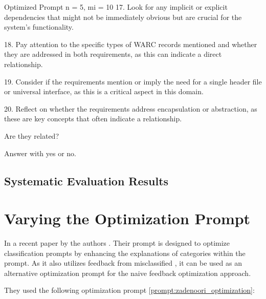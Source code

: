 \begin{prompt}{Optimized Prompt n = 5, mi = 10}
17. Look for any implicit or explicit dependencies that might not be immediately obvious but are crucial for the system's functionality.

18. Pay attention to the specific types of WARC records mentioned and whether they are addressed in both requirements, as this can indicate a direct relationship.

19. Consider if the requirements mention or imply the need for a single header file or universal interface, as this is a critical aspect in this domain.

20. Reflect on whether the requirements address encapsulation or abstraction, as these are key concepts that often indicate a relationship.

Are they related?

Answer with \textquotesingle{}yes\textquotesingle{} or \textquotesingle{}no\textquotesingle{}.
\end{prompt}
\subsection{Systematic Evaluation Results}

\begin{landscape}
\begin{table}
    \centering
    \renewcommand{\arraystretch}{1}
    
    \renewcommand{\arraystretch}{1}
    \caption{Naive prompt optimization approach considering previous misclassified \TLs}
    \label{tab:placeholder}
\end{table}
\end{landscape}

\section{Varying the Optimization Prompt}
In a recent paper by  the authors .
Their prompt is designed to optimize classification prompts by enhancing the explanations of categories within the prompt.
As it also utilizes feedback from misclassified \TLs, it can be used as an alternative optimization prompt for the naive feedback optimization approach.

They used the following optimization prompt \autoref{prompt:zadenoori_optimization}:


